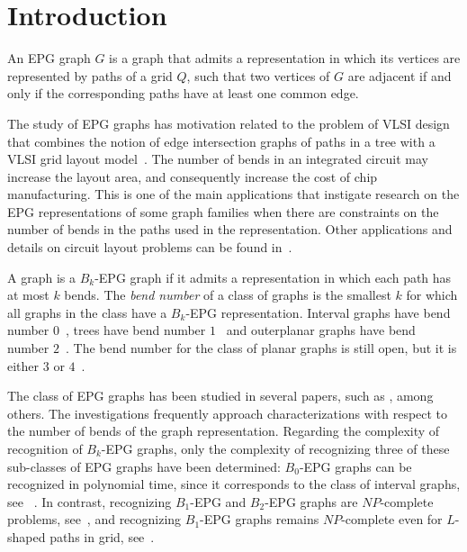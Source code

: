 \documentclass[runningheads]{llncs}
\begin{document}
\section{Introduction}
An EPG graph $G$ is a graph that admits a representation in which its vertices are represented by paths of a grid $Q$, such that two vertices of $G$ are adjacent if and only if the corresponding paths have at least one common edge. 

The study of EPG graphs has motivation related to the problem of VLSI design that combines the notion  of  edge  intersection graphs  of  paths  in  a  tree  with  a  VLSI  grid  layout  model~\cite{golumbic2009}. The number of bends in an integrated circuit may increase the layout area, and consequently increase the cost of chip manufacturing.
This is one of the main applications that instigate research on the EPG representations of some graph families when there are constraints on the number of bends in the paths used in the representation.
Other applications and  details  on  circuit  layout  problems can be found in~\cite{bandy1990, molitor1991}.  %

A graph is a $ B_k$-EPG graph if it admits a representation in which each path has at most $k$ bends. %
The \emph{bend number} of a class of graphs is the smallest $k$ for which all graphs in the class have a $B_k$-EPG representation. Interval graphs have bend number $0$~\cite{golumbic2009}, trees have bend number $1$~\cite{golumbic2009} and outerplanar graphs have bend number $2$~\cite{daniel2014b}. The bend number for the class of planar graphs is still open, but it is either $ 3 $ or $4$~\cite{daniel2014b}.



The class of EPG graphs has been studied in several papers, such as \cite{alcon2016, Asinowski2009, cohen2014, golumbic2009, heldt2014,  martin2017}, among others. The investigations frequently approach characterizations with respect to the number of bends of the graph representation. Regarding the complexity of recognition of $B_k$-EPG graphs, only the complexity of recognizing three of these sub-classes of EPG graphs have been determined: %
 $B_0$-EPG graphs can be recognized in polynomial time, since it corresponds to the class of interval graphs, see ~\cite{booth1976}. In contrast, recognizing $B_1$-EPG and $B_2$-EPG graphs are $NP$-complete problems, see~\cite{heldt2014, martin2017}, and recognizing $B_1$-EPG graphs  remains $NP$-complete even for $L$-shaped paths in grid, see~\cite{cameron2016edge}.
\end{document}
